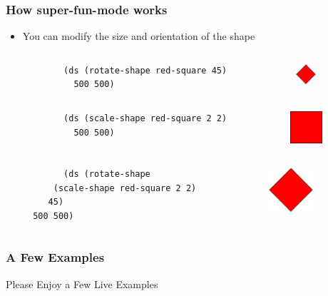 \documentclass{beamer}
\begin{document}
\begin{frame}[fragile]
	\frametitle{How super-fun-mode works}
	\begin{itemize}
	\item You can modify the size and orientation of the shape
	\begin{columns}[t]
		\begin{column}{.45\textwidth}
		\begin{verbatim}
		(ds (rotate-shape red-square 45) 
		  500 500)
		\end{verbatim}
		\end{column}
		\begin{column}{.3\textwidth}
		\begin{figure}[h]
			\includegraphics[width=0.8cm]{PresentationImages/red-rectangle-rotate.png}
			\end{figure}		
		\end{column}
		\end{columns} 
		\begin{columns}[t]
		\begin{column}{.45\textwidth}
		\begin{verbatim}
		(ds (scale-shape red-square 2 2) 
		  500 500)
		\end{verbatim}
		\end{column}
		\begin{column}{.3\textwidth}
		\begin{figure}[h]
			\includegraphics[width=1.2cm]{PresentationImages/red-rectangle-scale.png}
			\end{figure}		
		\end{column}
		\end{columns} 
		\begin{columns}[t]
		\begin{column}{.45\textwidth}
		\begin{verbatim}
		(ds (rotate-shape 
      (scale-shape red-square 2 2) 
     45)
  500 500)
		\end{verbatim}
		\end{column}
		\begin{column}{.3\textwidth}
		\begin{figure}[h]
			\includegraphics[width=1.7cm]{PresentationImages/red-rectangle-scale-rotate.png}
			\end{figure}		
		\end{column}
		\end{columns}
	\end{itemize}
\end{frame}
\begin{frame}
	\frametitle{A Few Examples}
	 Please Enjoy a Few Live Examples
\end{frame}
\end{document}
